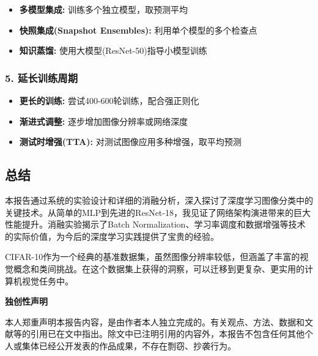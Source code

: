 \documentclass[12pt,a4paper]{article}
\begin{document}
\begin{itemize}[leftmargin=2em]
    \item \textbf{多模型集成:} 训练多个独立模型，取预测平均
    \item \textbf{快照集成(Snapshot Ensembles):} 利用单个模型的多个检查点
    \item \textbf{知识蒸馏:} 使用大模型(ResNet-50)指导小模型训练
\end{itemize}

\subsubsection{5. 延长训练周期}

\begin{itemize}[leftmargin=2em]
    \item \textbf{更长的训练:} 尝试400-600轮训练，配合强正则化
    \item \textbf{渐进式调整:} 逐步增加图像分辨率或网络深度
    \item \textbf{测试时增强(TTA):} 对测试图像应用多种增强，取平均预测
\end{itemize}

\subsection{总结}

本报告通过系统的实验设计和详细的消融分析，深入探讨了深度学习图像分类中的关键技术。从简单的MLP到先进的ResNet-18，我见证了网络架构演进带来的巨大性能提升。消融实验揭示了Batch Normalization、学习率调度和数据增强等技术的实际价值，为今后的深度学习实践提供了宝贵的经验。

CIFAR-10作为一个经典的基准数据集，虽然图像分辨率较低，但涵盖了丰富的视觉概念和类间挑战。在这个数据集上获得的洞察，可以迁移到更复杂、更实用的计算机视觉任务中。

\newpage
\thispagestyle{empty}
\vspace*{2cm}
\begin{center}
    {\Large\bfseries 独创性声明}
\end{center}

\vspace{1.5cm}

\noindent 本人郑重声明本报告内容，是由作者本人独立完成的。有关观点、方法、数据和文献等的引用已在文中指出。除文中已注明引用的内容外，本报告不包含任何其他个人或集体已经公开发表的作品成果，不存在剽窃、抄袭行为。

\vspace{1cm}
\end{document}
